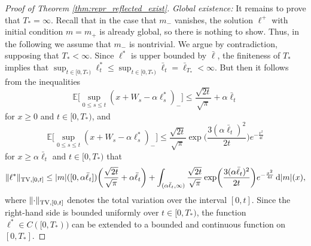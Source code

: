 \documentclass[11pt, a4paper]{article}
\theoremstyle{plain}
\theoremstyle{definition}
\theoremstyle{remark}
\numberwithin{equation}{section}
\newcommand{\ev}{\mathbb{E}}
\renewcommand{\d}{\mathrm{d}}
\begin{document}
\begin{proof}[Proof of Theorem \ref{thm:repr_reflected_exist}]
\textit{Global existence:} It remains to prove that $T_{\ast} = \infty$. Recall that in the case that $m_-$ vanishes, the solution $\ell^+$ with initial condition $m = m_+$ is already global, so there is nothing to show. Thus, in the following we assume that $m_-$ is nontrivial. We argue by contradiction, supposing that $T_{\ast} < \infty$. Since $\ell^{\ast}$ is upper bounded by $\bar{\ell}$, the finiteness of $T_{\ast}$ implies that $\sup_{t \in [0, T_{\ast})} \ell^{\ast}_t \leq \sup_{t \in [0, T_{\ast})} \bar{\ell}_t = \bar{\ell}_{T_{\ast}} < \infty$. But then it follows from the inequalities
\begin{equation*}
    \ev\biggl[\sup_{0 \leq s \leq t} (x + W_s - \alpha \ell^{\ast}_s)_-\biggr] \leq \frac{\sqrt{2t}}{\sqrt{\pi}} + \alpha \bar{\ell}_t
\end{equation*}
for $x \geq 0$ and $t \in [0, T_{\ast})$, and
\begin{equation*}
    \ev\biggl[\sup_{0 \leq s \leq t} (x + W_s - \alpha \ell^{\ast}_s)_-\biggr] \leq \frac{\sqrt{2 t}}{\sqrt{\pi}} \exp\biggl(\frac{3 (\alpha \bar{\ell}_t)^2}{2t}\biggr) e^{-\frac{x^2}{4t}}
\end{equation*}
for $x \geq \alpha \bar{\ell}_t$ and $t \in [0, T_{\ast})$ that
\begin{equation*}
    \lVert \ell^{\ast}\rVert_{\textup{TV}, [0, t]} \leq \lvert m\rvert([0, \alpha \bar{\ell}_t]) \biggl(\frac{\sqrt{2t}}{\sqrt{\pi}} + \alpha \bar{\ell}_t\biggr) + \int_{(\alpha \bar{\ell}_t, \infty)} \frac{\sqrt{2 t}}{\sqrt{\pi}} \exp\biggl(\frac{3 (\alpha \bar{\ell}_t)^2}{2t}\biggr) e^{-\frac{x^2}{4t}} \, \d \lvert m\rvert(x),
\end{equation*}
where $\lVert \cdot\rVert_{\textup{TV}, [0, t]}$ denotes the total variation over the interval $[0, t]$. Since the right-hand side is bounded uniformly over $t \in [0, T_{\ast})$, the function $\ell^{\ast} \in C([0, T_{\ast}))$ can be extended to a bounded and continuous function on $[0, T_{\ast}]$. 


\end{proof}
\end{document}
